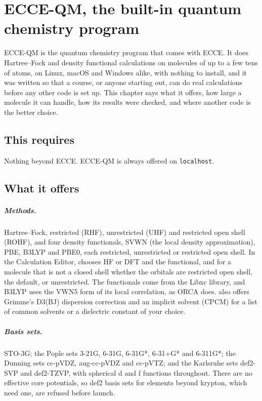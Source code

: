 \chapter{ECCE-QM, the built-in quantum chemistry program}
\label{ch:ecce-qm}

ECCE-QM is the quantum chemistry program that comes with ECCE. It does Hartree--Fock and density functional calculations on molecules of up to a few tens of atoms, on Linux, macOS and Windows alike, with nothing to install, and it was written so that a course, or anyone starting out, can do real calculations before any other code is set up. This chapter says what it offers, how large a molecule it can handle, how its results were checked, and where another code is the better choice.

\section*{This requires}
Nothing beyond ECCE. ECCE-QM is always offered on \texttt{localhost}.

\section{What it offers}
\paragraph{Methods.} Hartree--Fock, restricted (RHF), unrestricted (UHF) and restricted open shell (ROHF), and four density functionals, SVWN (the local density approximation), PBE, B3LYP and PBE0, each restricted, unrestricted or restricted open shell. In the Calculation Editor,  chooses HF or DFT and  the functional, and for a molecule that is not a closed shell whether the orbitals are restricted open shell, the default, or unrestricted. The functionals come from the Libxc library, and B3LYP uses the VWN5 form of its local correlation, as ORCA does.  also offers Grimme's D3(BJ) dispersion correction and an implicit solvent (CPCM) for a list of common solvents or a dielectric constant of your choice.

\paragraph{Basis sets.} STO-3G; the Pople sets 3-21G, 6-31G, 6-31G*, 6-31+G* and 6-311G*; the Dunning sets cc-pVDZ, aug-cc-pVDZ and cc-pVTZ; and the Karlsruhe sets def2-SVP and def2-TZVP, with spherical d and f functions throughout. There are no effective core potentials, so def2 basis sets for elements beyond krypton, which need one, are refused before launch.

